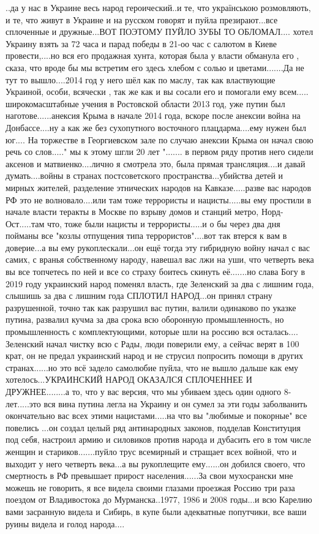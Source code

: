 {%
..да у нас в Украине весь народ героический..и те, что українською розмовляють,
и те, что живут в Украине и на русском говорят и пуйла презирают...все
сплоченные и дружные...ВОТ ПОЭТОМУ ПУЙЛО ЗУБЫ ТО ОБЛОМАЛ.... хотел Украину
взять за 72 часа и парад победы в 21-оо час с салютом в Киеве провести,....но
вся его продажная хунта, которая была у власти обманула его , сказа, что вроде
бы мы встретим его здесь хлебом с солью и цветами.......Да не тут то
вышло....2014 год у него шёл как по маслу, так как властвующие Украиной, особи,
всячески , так же как и вы сосали его и помогали ему всем..... широкомасштабные
учения в Ростовской области 2013 год, уже путин был наготове......анексия Крыма
в начале 2014 года, вскоре после анексии война на Донбассе....ну а как же без
сухопутного восточного плацдарма....ему нужен был юг.... На торжестве в
Георгиевском зале по случаю анексии Крыма он начал свою речь со слов....." мы к
этому шгли 20 лет "....... в первом ряду против него сидели аксенов и
матвиенко....лично я смотрела это, была прямая трансляция....и давай
думать....войны в странах постсоветского пространства...убийства детей и мирных
жителей, разделение этнических народов на Кавказе.....разве вас народов РФ это
не волновало....или там тоже террористы и нацисты.....вы ему простили в начале
власти теракты в Москве по взрыву домов и станций метро, Норд-Ост.....там что,
тоже были нацисты и террористы.....и о бы через два дня пойманы все "козлы
отпущения типа террористов"....вот так втерся к вам в доверие...а вы ему
рукоплескали...он ещё тогда эту гибридную войну начал с вас самих, с вранья
собственному народу, навешал вас лжи на уши, что четверть века вы все топчетесь
по ней и все со страху боитесь скинуть её.......но слава Богу в 2019 году
украинский народ поменял власть, где Зеленский за два с лишним года, слышишь за
два с лишним года СПЛОТИЛ НАРОД...он принял страну разрушенной, точно так как
разрушил вас путин, валили одинаково по указке путина, развалил кучма за два
срока всю оборонную промышленность, но промышленность с комплектующими, которые
шли на россию вся осталась.... Зеленский начал чистку всю с Рады, люди поверили
ему, а сейчас верят в 100 крат, он не предал украинский народ и не струсил
попросить помощи в других странах......но это всё задело самолюбие пуйла, что
не вышло дальше как ему хотелось...УКРАИНСКИЙ НАРОД ОКАЗАЛСЯ СПЛОЧЕННЕЕ И
ДРУЖНЕЕ........а то, что у вас версия, что мы убиваем здесь один одного
8-лет.....это вся вина путина легла на Украину и он сумел за эти годы
заболванить окончательно вас всех этими нацистами.....на что вы "любимые и
покорные" все повелись ...он создал целый ряд антинародных законов, подделав
Конституция под себя, настроил армию и силовиков против народа и дубасить его в
том числе женщин и стариков.......пуйло трус всемирный и стращает всех войной,
что и выходит у него четверть века...а вы рукоплещите ему......он добился
своего, что смертность в РФ превышает прирост населения......За свои
мухосрански мне можешь не говорить, я все видела своими глазами проезжая Россию
три раза поездом от Владивостока до Мурманска..1977, 1986 и 2008 годы...и всю
Карелию вами засранную видела и Сибирь, в купе были адекватные попутчики, все
ваши руины видела и голод народа....

}
